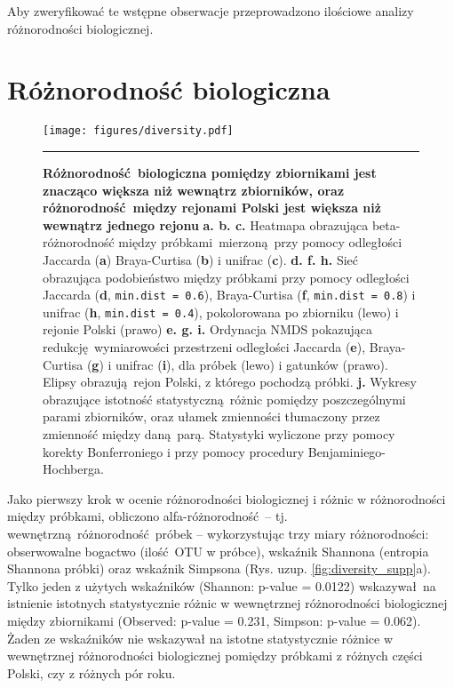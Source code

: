 \documentclass[two column, twoside, a4paper]{article}
\begin{document}
Aby zweryfikować te wstępne obserwacje przeprowadzono ilościowe analizy różnorodności biologicznej.

\section{Różnorodność biologiczna}

\begin{figure*}[ht]
  \vspace{-0.95em}
  \begin{center}
    \texttt{[image: figures/diversity.pdf]}
  \end{center}

  \vspace{-0.7em}

  \hrule width0.5\textwidth \vspace{0.35em}

  \caption{
    \textbf{Różnorodność biologiczna pomiędzy zbiornikami jest znacząco większa niż wewnątrz zbiorników, oraz różnorodność między rejonami Polski jest większa niż wewnątrz jednego rejonu} 
    \textbf{a. b. c.} Heatmapa obrazująca beta-różnorodność między próbkami mierzoną przy pomocy odległości Jaccarda (\textbf{a}) Braya-Curtisa (\textbf{b}) i unifrac (\textbf{c}).
    \textbf{d. f. h.} Sieć obrazująca podobieństwo między próbkami przy pomocy odległości Jaccarda (\textbf{d}, \texttt{min.dist = 0.6}), Braya-Curtisa (\textbf{f}, \texttt{min.dist = 0.8}) i unifrac (\textbf{h}, \texttt{min.dist = 0.4}), pokolorowana po zbiorniku (lewo) i rejonie Polski (prawo)
    \textbf{e. g. i.} Ordynacja NMDS pokazująca redukcję wymiarowości przestrzeni odległości Jaccarda (\textbf{e}), Braya-Curtisa (\textbf{g}) i unifrac (\textbf{i}), dla próbek (lewo) i gatunków (prawo). Elipsy obrazują rejon Polski, z którego pochodzą próbki.
    \textbf{j.} Wykresy obrazujące istotność statystyczną różnic pomiędzy poszczególnymi parami zbiorników, oraz ułamek zmienności tłumaczony przez zmienność między daną parą. Statystyki wyliczone przy pomocy korekty Bonferroniego i przy pomocy procedury Benjaminiego-Hochberga.
  }
  \label{fig:diversity}
  \vspace{-1.25em}
\end{figure*}

Jako pierwszy krok w ocenie różnorodności biologicznej i różnic w różnorodności między próbkami, obliczono alfa-różnorodność -- tj. wewnętrzną różnorodność próbek -- wykorzystując trzy miary różnorodności: obserwowalne bogactwo (ilość OTU w próbce), wskaźnik Shannona (entropia Shannona próbki) oraz wskaźnik Simpsona (Rys. uzup. \ref{fig:diversity_supp}a). Tylko jeden z użytych wskaźników (Shannon: p-value = 0.0122) wskazywał na istnienie istotnych statystycznie różnic w wewnętrznej różnorodności biologicznej między zbiornikami (Observed: p-value = 0.231, Simpson: p-value = 0.062). Żaden ze wskaźników nie wskazywał na istotne statystycznie różnice w wewnętrznej różnorodności biologicznej pomiędzy próbkami z różnych części Polski, czy z różnych pór roku.
\end{document}
